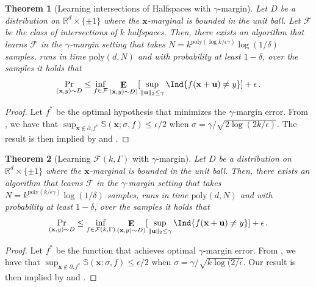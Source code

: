 \documentclass[10pt,a4paper]{article}
\newtheorem{theorem}{Theorem}[section]
\newcommand\twonorm[1]{\|#1\|_2}
\renewcommand\vec[1]{\mathbf{#1}}
\DeclareMathOperator*{\E}{\mathbf{E}}
\newcommand{\R}{\mathbb{R}}
\newcommand{\poly}{\mathrm{poly}}
\newcommand{\1}{\Ind}
\newcommand{\x}{\vec x}
\newcommand{\vu}{\vec u}
\newcommand{\F}{\mathcal{F}}
\begin{document}
\begin{theorem}[Learning intersections of Halfspaces with $\gamma$-margin]
    Let $D$ be a distribution on $\R^{d}\times \{\pm 1\}$ where the $\x$-marginal is bounded in the unit ball. Let $\F$ be the class of intersections of $k$ halfspaces. Then, there exists an algorithm that learns $\F$ in the $\gamma$-margin setting that takes $N=k^{\poly(\log k/\epsilon\gamma)}\log(1/\delta)$ samples, runs in time $\poly(d,N)$ and with probability at least $1-\delta$, over the samples it holds that
    \[
    \Pr_{(\x,y)\sim D}\leq \inf_{f\in \F}\E_{(\x,y)\sim D)}[\sup_{\twonorm{\vu}\leq \gamma}\1\{f(\x+\vu)\neq y\}]+\epsilon\,.
    \]
\end{theorem}
\begin{proof}
    Let $f^*$ be the optimal hypothesis that minimizes the $\gamma$-margin error. From ,  we have that $\sup_{\x\notin \partial_{\gamma}f^*}\mathbb{S}(\x;\sigma,f)\leq \epsilon/2$ when $\sigma=\gamma/\sqrt{2\log(2k/\epsilon)}$.  The result is then implied by  and .
\end{proof}
\begin{theorem}[Learning $\F(k,\Gamma)$ with $\gamma$-margin]
    Let $D$ be a distribution on $\R^{d}\times \{\pm 1\}$ where the $\x$-marginal is bounded in the unit ball. Then, there exists an algorithm that learns $\F$ in the $\gamma$-margin setting that takes $N=k^{\poly(k/\epsilon\gamma)}\log(1/\delta)$ samples, runs in time $\poly(d,N)$ and with probability at least $1-\delta$, over the samples it holds that
    \[
    \Pr_{(\x,y)\sim D}\leq \inf_{f\in \F(k,\Gamma)}\E_{(\x,y)\sim D)}[\sup_{\twonorm{\vu}\leq \gamma}\1\{f(\x+\vu)\neq y\}]+\epsilon\,.
    \]
\end{theorem}
\begin{proof}
Let $f^*$ be the function that achieves optimal $\gamma$-margin error. From , we have that $\sup_{\x\notin\partial_{\gamma}f^*}\mathbb{S}(\x;\sigma,f)\leq \epsilon/2$ when $\sigma=\gamma/\sqrt{k\log(2/\epsilon}$. Our result is then implied by  and . 
\end{proof}
\renewcommand{\arraystretch}{2}
\end{document}
